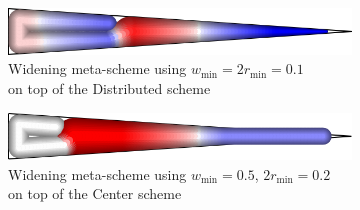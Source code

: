 {\begin{figure}
\centering
\setlength{\figwidth}{.35\columnwidth}
\setlength{\figwidthTwo}{.6\columnwidth}
\begin{minipage}[b]{\figwidthTwo} \centering
\begin{subfigure}[b]{\figwidthTwo}\centering
\includegraphics[width=\columnwidth]{sources-validation-wedge-TEST-Distributed-feature-size.png}
\caption{Widening meta-scheme using $w_\text{min} = 2 r_\text{min} = 0.1$
\\ on top of the Distributed scheme}
\label{min_feature_size}
\end{subfigure}
\begin{subfigure}[b]{\figwidthTwo}\centering
\includegraphics[width=\columnwidth]{sources-validation-wedge-TEST-Center-widening.png}
\caption{Widening meta-scheme using $w_\text{min} = 0.5$, $2 r_\text{min} = 0.2$ 
\\ on top of the Center scheme}
\label{widening}
\end{subfigure}
\end{minipage}
\begin{subfigure}[b]{\figwidth}\centering

\end{subfigure}
\end{figure}}
